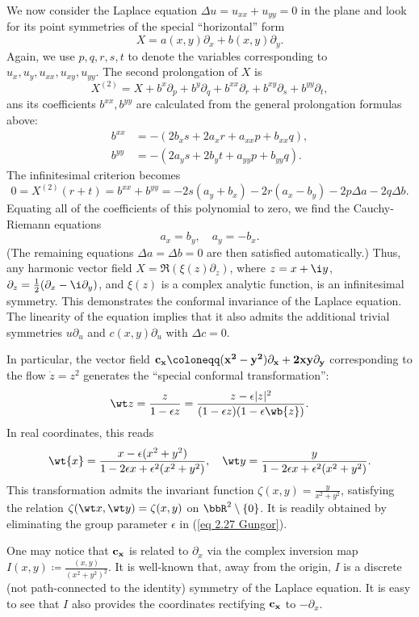 \begin{example}
    We now consider the Laplace equation $\Delta u=u_{xx}+u_{yy}=0$ in the plane and look for its point symmetries of the special ``horizontal'' form 
    \[X=a(x,y)\partial_x+b(x,y)\partial_y.\]
    Again, we use $p,q,r,s,t$ to denote the variables corresponding to $u_x,u_y,u_{xx},u_{xy},u_{yy}$. The second prolongation of $X$ is 
    \[X^{(2)}=X+b^x\partial_{p}+b^y\partial_q+b^{xx}\partial_r+b^{xy}\partial_s+b^{yy}\partial_t,\]
    ans its coefficients $b^{xx},b^{yy}$ are calculated from the general prolongation formulas above:
    \begin{align}
        b^{xx}&=-(2b_x s+2a_x r+a_{xx}p+b_{xx}q),\\
        b^{yy}&=-(2a_y s+2b_y t+a_{yy}p+b_{yy}q).
    \end{align}
    The infinitesimal criterion becomes 
    \[0=X^{(2)}(r+t)=b^{xx}+b^{yy}=-2s(a_y+b_x)-2r(a_x-b_y)-2p\Delta a-2q\Delta b.\]
    Equating all of the coefficients of this polynomial to zero, we find the Cauchy-Riemann equations 
    \[a_x=b_y,\quad a_y=-b_x.\]
    (The remaining equations $\Delta a=\Delta b=0$ are then satisfied automatically.) Thus, any harmonic vector field $X=\Re(\xi(z)\partial_z)$, where $z=x+\i y$, $\partial_z=\frac12(\partial_x-\i \partial_y)$, and $\xi(z)$ is a complex analytic function, is an infinitesimal symmetry. This demonstrates the conformal invariance of the Laplace equation. The linearity of the equation implies that it also admits the additional trivial symmetries $u\partial_u$ and $c(x,y)\partial_u$ with $\Delta c=0$.

    In particular, the vector field $\bf{c}_x\coloneqq (x^2-y^2)\partial_x+2xy\partial_y$ corresponding to the flow $\dot z=z^2$ generates the ``special conformal transformation'':
    \[\wt z=\frac{z}{1-\epsilon z}=\frac{z-\epsilon |z|^2}{(1-\epsilon z)(1-\epsilon \wb{z})}.\]
    In real coordinates, this reads 
    \[\wt{x}=\frac{x-\epsilon(x^2+y^2)}{1-2\epsilon x+\epsilon^2(x^2+y^2)},\quad \wt y=\frac{y}{1-2\epsilon x+\epsilon^2(x^2+y^2)}.\label{eq 2.27 Gungor}\]
    This transformation admits the invariant function $\zeta(x,y)=\frac{y}{x^2+y^2}$, satisfying the relation $\zeta(\wt x,\wt y)=\zeta(x,y)$ on $\bbR^2\setminus\{0\}$. It is readily obtained by eliminating the group parameter $\epsilon$ in (\ref{eq 2.27 Gungor}).

    One may notice that $\bf{c}_x$ is related to $\partial_x$ via the complex inversion map $I(x,y)\coloneqq \frac{(x,y)}{(x^2+y^2)^2}$. It is well-known that, away from the origin, $I$ is a discrete (not path-connected to the identity) symmetry of the Laplace equation. It is easy to see that $I$ also provides the coordinates rectifying $\bf{c}_x$ to $-\partial_x$.


\end{example}
